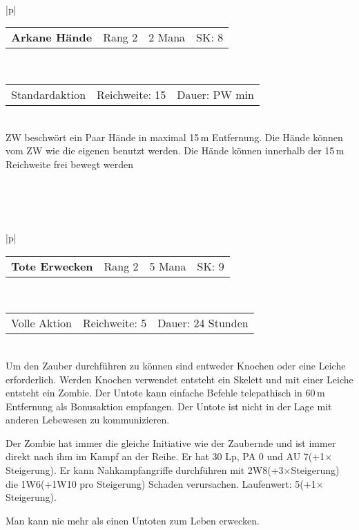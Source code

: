 \documentclass[../../Heldenanleitung2]{subfiles}
\begin{document}
\\\\\\
\begin{tabular}{|p{\textwidth}|}
\hline
\begin{tabularx}{\textwidth}{X|X|X|X}
\textbf{Arkane Hände} & Rang 2 & 2 Mana & SK: 8
\end{tabularx} \\ \hline
\begin{tabularx}{\textwidth}{X|X|X}
Standardaktion & Reichweite: 15 & Dauer: PW min
\end{tabularx} \\ \hline
ZW beschwört ein Paar Hände in maximal 15\,m Entfernung. Die Hände können vom ZW wie die eigenen benutzt werden. Die Hände können innerhalb der 15\,m Reichweite frei bewegt werden
\\ \hline
\end{tabular}
\\\\\\
\begin{tabular}{|p{\textwidth}|}
\hline
\begin{tabularx}{\textwidth}{X|X|X|X}
\textbf{Tote Erwecken} & Rang 2 & 5 Mana & SK: 9
\end{tabularx} \\ \hline
\begin{tabularx}{\textwidth}{X|X|X}
Volle Aktion & Reichweite: 5 & Dauer: 24 Stunden
\end{tabularx} \\ \hline
Um den Zauber durchführen zu können sind entweder Knochen oder eine Leiche erforderlich. Werden Knochen verwendet entsteht ein Skelett und mit einer Leiche entsteht ein Zombie. Der Untote kann einfache Befehle telepathisch in 60\,m Entfernung als Bonusaktion empfangen. Der Untote ist nicht in der Lage mit anderen Lebewesen zu kommunizieren.

Der Zombie hat immer die gleiche Initiative wie der Zaubernde und ist immer direkt nach ihm im Kampf an der Reihe. Er hat 30 Lp, PA 0 und AU 7(+1$\times$Steigerung). Er kann Nahkampfangriffe durchführen mit 2W8(+3$\times$Steigerung) die 1W6(+1W10 pro Steigerung) Schaden verursachen. Laufenwert: 5(+1$\times$Steigerung).

Man kann nie mehr als einen Untoten zum Leben erwecken.
\\ \hline
\end{tabular}
\\\\\\
\end{document}
